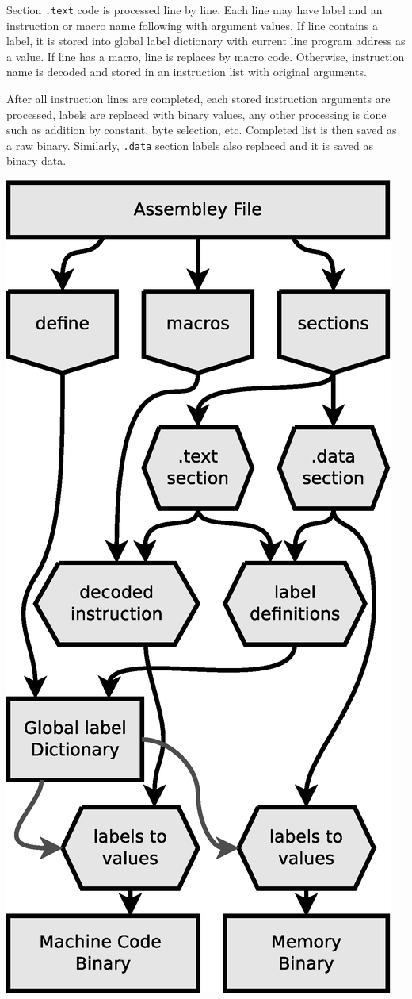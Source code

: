 Section \texttt{.text} code is processed line by line. Each line may have label and an instruction or macro name following with argument values. If line contains a label, it is stored into global label dictionary with current line program address as a value. If line has a macro, line is replaces by macro code. Otherwise, instruction name is decoded and stored in an instruction list with original arguments.

After all instruction lines are completed, each stored instruction arguments are processed, labels are replaced with binary values, any other processing is done such as addition by constant, byte selection, etc. Completed list is then saved as a raw binary. Similarly, \texttt{.data} section labels also replaced and it is saved as binary data.

\begin{colfigure}
	\centering
	\includegraphics[scale=0.4]{../resources/assembler.eps}

\end{colfigure}
